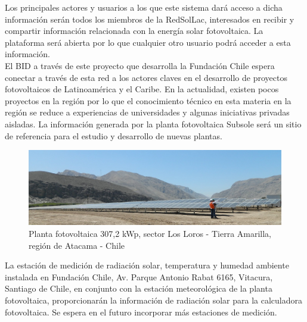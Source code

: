 Los principales actores y usuarios a los que este sistema dará acceso a dicha información serán todos los miembros de la RedSolLac\cite{redSolLac:1}, interesados en recibir y compartir información relacionada con la energía solar fotovoltaica. La plataforma será abierta por lo que cualquier otro usuario podrá acceder a esta información.\\

El BID a través de este proyecto que desarrolla la Fundación Chile espera conectar a través de esta red a los actores claves en el desarrollo de proyectos fotovoltaicos de Latinoamérica y el Caribe. En la actualidad, existen pocos proyectos en la región por lo que el conocimiento técnico en esta materia en la región se reduce a experiencias de universidades y algunas iniciativas privadas aisladas. La información generada por la planta fotovoltaica Subsole será un sitio de referencia para el estudio y desarrollo de nuevas plantas.\\

\begin{figure}[h!]
        \centering
        \includegraphics[scale=1.4]{images/plantaSubSoleLorosAmarilla}
        \caption{\tiny Planta fotovoltaica 307,2 kWp, sector Los Loros - Tierra Amarilla, región de Atacama - Chile}
\end{figure}

La estación de medición de radiación solar, temperatura y humedad ambiente instalada en Fundación Chile, Av. Parque Antonio Rabat 6165, Vitacura, Santiago de Chile, en conjunto con la estación meteorológica de la planta fotovoltaica, proporcionarán la información de radiación solar para la calculadora fotovoltaica. Se espera en el futuro incorporar más estaciones de medición.\\

